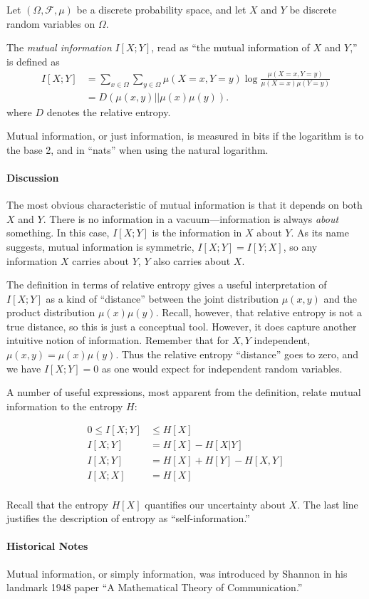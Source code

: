 \documentclass[12pt]{article}
\begin{document}
Let $(\Omega, \mathcal{F}, \mu)$ be a discrete probability space, and let $X$ and $Y$ be discrete random variables on $\Omega$.  

The \emph{mutual information} $I[X;Y]$, read as ``the mutual information of $X$ and $Y$,'' is defined as
\begin{align*}
I[X;Y] &= \sum_{x \in \Omega}\sum_{y \in \Omega} \mu(X=x,Y=y) \log \frac{\mu(X=x,Y=y)}{\mu(X=x)\mu(Y=y)}\\
&= D(\mu(x,y)||\mu(x)\mu(y)).
\end{align*}
where $D$ denotes the relative entropy.

Mutual information, or just information, is measured in bits if the logarithm is to the base 2, and in ``nats'' when using the natural logarithm.

\paragraph{Discussion}
The most obvious characteristic of mutual information is that it depends on both $X$ and $Y$.  There is no information in a vacuum---information is always \emph{about} something.  In this case, $I[X;Y]$ is the information in $X$ about $Y$.  As its name suggests, mutual information is symmetric, $I[X;Y] = I[Y;X]$, so any information $X$ carries about $Y$, $Y$ also carries about $X$.

The definition in terms of relative entropy gives a useful interpretation of $I[X;Y]$ as a kind of ``distance'' between the joint distribution $\mu(x,y)$ and the product distribution $\mu(x)\mu(y)$.  Recall, however, that relative entropy is not a true distance, so this is just a conceptual tool.  However, it does capture another intuitive notion of information.  Remember that for $X,Y$ independent, $\mu(x,y) = \mu(x)\mu(y)$.  Thus the relative entropy ``distance'' goes to zero, and we have $I[X;Y]=0$ as one would expect for independent random variables.

 A number of useful expressions, most apparent from the definition, relate mutual information to the entropy $H$:

\begin{align}
0 \le I[X;Y] &\le H[X]\\
I[X;Y] &= H[X] - H[X|Y]\\
I[X;Y] &= H[X] + H[Y] - H[X,Y]\\
I[X;X] &= H[X]\\
\end{align}

Recall that the entropy $H[X]$ quantifies our uncertainty about $X$.  The last line justifies the description of entropy as ``self-information.''

\paragraph{Historical Notes}
Mutual information, or simply information, was introduced by Shannon in his landmark 1948 paper ``A Mathematical Theory of Communication.''
\end{document}
